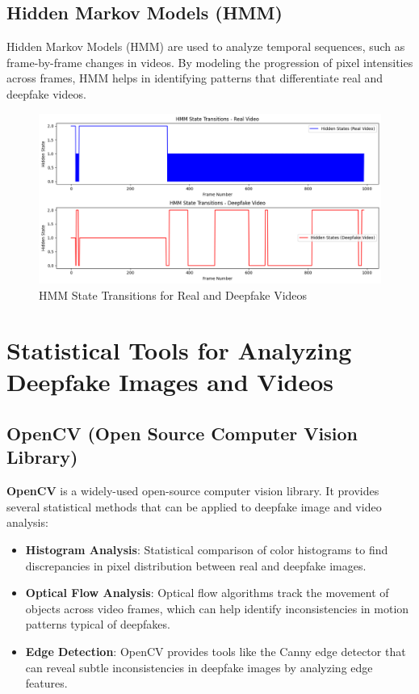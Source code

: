 \documentclass{article}
\begin{document}
\subsection{Hidden Markov Models (HMM)}
Hidden Markov Models (HMM) are used to analyze temporal sequences, such as frame-by-frame changes in videos. By modeling the progression of pixel intensities across frames, HMM helps in identifying patterns that differentiate real and deepfake videos.


\begin{figure}[h]
\centering
\includegraphics[width=1\textwidth]{hmm_results.png}
\caption{HMM State Transitions for Real and Deepfake Videos}
\label{fig:hmm_results}
\end{figure}

\section{Statistical Tools for Analyzing Deepfake Images and Videos}

\subsection{OpenCV (Open Source Computer Vision Library)}
\textbf{OpenCV} is a widely-used open-source computer vision library. It provides several statistical methods that can be applied to deepfake image and video analysis:
\begin{itemize}
    \item \textbf{Histogram Analysis}: Statistical comparison of color histograms to find discrepancies in pixel distribution between real and deepfake images.
    \item \textbf{Optical Flow Analysis}: Optical flow algorithms track the movement of objects across video frames, which can help identify inconsistencies in motion patterns typical of deepfakes.
    \item \textbf{Edge Detection}: OpenCV provides tools like the Canny edge detector that can reveal subtle inconsistencies in deepfake images by analyzing edge features.
\end{itemize}
\end{document}
